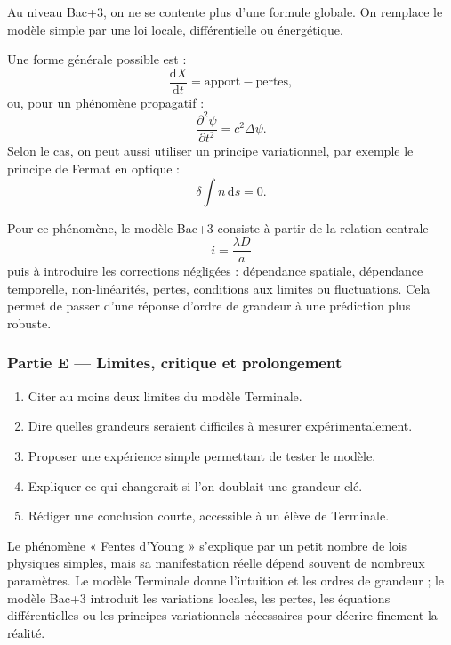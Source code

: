 \documentclass[11pt,a4paper]{article}
\begin{document}
\begin{approfondissementbox}
Au niveau Bac+3, on ne se contente plus d'une formule globale. On remplace le modèle simple par une loi locale, différentielle ou énergétique.

Une forme générale possible est :
\[
\frac{\mathrm d X}{\mathrm dt}=\text{apport}-\text{pertes},
\]
ou, pour un phénomène propagatif :
\[
\frac{\partial^2 \psi}{\partial t^2}=c^2\Delta\psi.
\]
Selon le cas, on peut aussi utiliser un principe variationnel, par exemple le principe de Fermat en optique :
\[
\delta \int n\,\mathrm ds=0.
\]

Pour ce phénomène, le modèle Bac+3 consiste à partir de la relation centrale
\[
i=\frac{\lambda D}{a}
\]
puis à introduire les corrections négligées : dépendance spatiale, dépendance temporelle, non-linéarités, pertes, conditions aux limites ou fluctuations. Cela permet de passer d'une réponse d'ordre de grandeur à une prédiction plus robuste.
\end{approfondissementbox}

\subsubsection*{Partie E — Limites, critique et prolongement}

\begin{enumerate}
  \item Citer au moins deux limites du modèle Terminale.
  \item Dire quelles grandeurs seraient difficiles à mesurer expérimentalement.
  \item Proposer une expérience simple permettant de tester le modèle.
  \item Expliquer ce qui changerait si l'on doublait une grandeur clé.
  \item Rédiger une conclusion courte, accessible à un élève de Terminale.
\end{enumerate}

\begin{corrigebox}
Le phénomène « Fentes d'Young » s'explique par un petit nombre de lois physiques simples, mais sa manifestation réelle dépend souvent de nombreux paramètres. Le modèle Terminale donne l'intuition et les ordres de grandeur ; le modèle Bac+3 introduit les variations locales, les pertes, les équations différentielles ou les principes variationnels nécessaires pour décrire finement la réalité.
\end{corrigebox}
\end{document}
